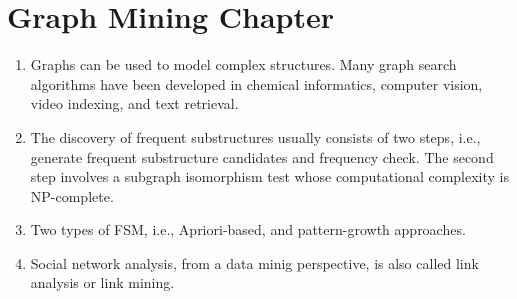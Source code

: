 \documentclass[14pt]{article}
\begin{document}
\section{Graph Mining Chapter}
\begin{enumerate}
 \item Graphs can be used to model complex structures. Many graph search algorithms have been developed in chemical informatics, computer vision, video indexing, and text retrieval. 
 \item The discovery of frequent substructures usually consists of two steps, i.e., generate frequent substructure candidates and frequency check. The second step involves a subgraph isomorphism test whose computational complexity is NP-complete.
 \item Two types of FSM, i.e., Apriori-based, and pattern-growth approaches.
 \item Social network analysis, from a data minig perspective, is also called link analysis or link mining. 
\end{enumerate}
\end{document}
